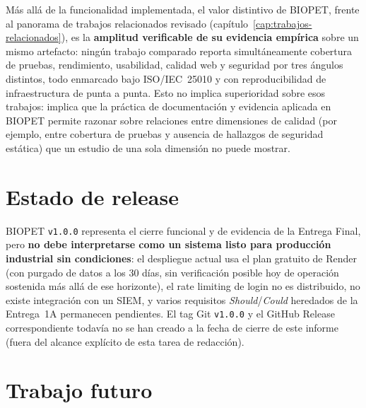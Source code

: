 M\'as all\'a de la funcionalidad implementada, el valor distintivo de
BIOPET, frente al panorama de trabajos relacionados revisado
(cap\'itulo~\ref{cap:trabajos-relacionados}), es la \textbf{amplitud
verificable de su evidencia emp\'irica} sobre un mismo artefacto: ning\'un
trabajo comparado reporta simult\'aneamente cobertura de pruebas,
rendimiento, usabilidad, calidad web y seguridad por tres \'angulos
distintos, todo enmarcado bajo ISO/IEC~25010 y con reproducibilidad de
infraestructura de punta a punta. Esto no implica superioridad sobre esos
trabajos: implica que la pr\'actica de documentaci\'on y evidencia aplicada
en BIOPET permite razonar sobre relaciones entre dimensiones de calidad
(por ejemplo, entre cobertura de pruebas y ausencia de hallazgos de
seguridad est\'atica) que un estudio de una sola dimensi\'on no puede
mostrar.

\section{Estado de release}

BIOPET \texttt{v1.0.0} representa el cierre funcional y de evidencia de la
Entrega Final, pero \textbf{no debe interpretarse como un sistema listo
para producci\'on industrial sin condiciones}: el despliegue actual usa el
plan gratuito de Render (con purgado de datos a los 30 d\'ias, sin
verificaci\'on posible hoy de operaci\'on sostenida m\'as all\'a de ese
horizonte), el rate limiting de login no es distribuido, no existe
integraci\'on con un SIEM, y varios requisitos \emph{Should}/\emph{Could}
heredados de la Entrega~1A permanecen pendientes. El tag Git \texttt{v1.0.0}
y el GitHub Release correspondiente todav\'ia no se han creado a la fecha
de cierre de este informe (fuera del alcance expl\'icito de esta tarea de
redacci\'on).

\section{Trabajo futuro}

